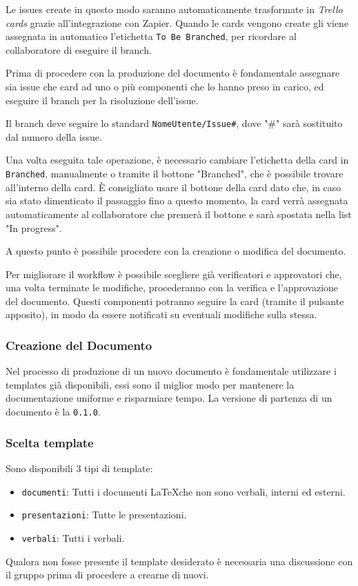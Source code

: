 Le issues create in questo modo saranno automaticamente trasformate in \textit{Trello cards} grazie all'integrazione con Zapier.
Quando le cards vengono create gli viene assegnata in automatico l'etichetta \texttt{To Be Branched}, per ricordare al collaboratore di eseguire il branch.

Prima di procedere con la produzione del documento è fondamentale assegnare sia issue che card ad uno o più componenti che lo hanno preso in carico, ed eseguire il branch per la risoluzione dell'issue.

Il branch deve seguire lo standard \texttt{NomeUtente/Issue\#}, dove "\#" sarà sostituito dal numero della issue.

Una volta eseguita tale operazione, è necessario cambiare l'etichetta della card in \texttt{Branched}, manualmente o tramite il bottone "Branched", che è possibile trovare all'interno della card.
È consigliato usare il bottone della card dato che, in caso sia stato dimenticato il passaggio fino a questo momento, la card verrà assegnata automaticamente al collaboratore che premerà il bottone e sarà spostata nella list "In progress".

A questo punto è possibile procedere con la creazione o modifica del documento.

Per migliorare il workflow è possibile scegliere già verificatori e approvatori che, una volta terminate le modifiche, procederanno con la verifica e l'approvazione del documento. Questi componenti potranno seguire la card (tramite il pulsante apposito), in modo da essere notificati su eventuali modifiche sulla stessa.

\subsubsection{Creazione del Documento}
Nel processo di produzione di un nuovo documento è fondamentale utilizzare i templates già
disponibili, essi sono il miglior modo per mantenere la documentazione uniforme e
risparmiare tempo.
La versione di partenza di un documento è la \texttt{0.1.0}.

\subsubsection{Scelta template}

Sono disponibili 3 tipi di template:
\begin{itemize}
    \item \texttt{documenti}: Tutti i documenti \LaTeX che non sono verbali, interni ed esterni.
    \item \texttt{presentazioni}: Tutte le presentazioni.
    \item \texttt{verbali}: Tutti i verbali.
\end{itemize}
Qualora non fosse presente il template desiderato è necessaria una discussione con il gruppo prima di procedere a crearne di nuovi.

